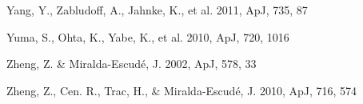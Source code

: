 \documentclass{emulateapj}
\def\apj{ApJ}
\begin{document}
\begin{thebibliography}{}
 Yang, Y., Zabludoff, A., Jahnke, K., et al. 2011, \apj, 735, 87 

 Yuma, S., Ohta, K., Yabe, K., et al. 2010, \apj, 720, 1016

 Zheng, Z. \& Miralda-Escud\'{e}, J. 2002, \apj, 578, 33

 Zheng, Z., Cen. R., Trac, H., \& Miralda-Escud\'{e}, J. 2010, \apj, 716, 574

\end{thebibliography}
\end{document}
